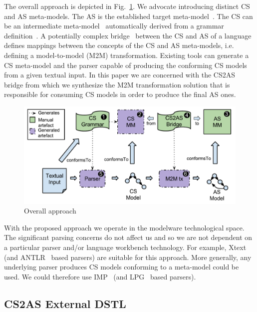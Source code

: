 \documentclass{llncs}
\begin{document}
The overall approach is depicted in Fig.~\ref{fig:OverallApproach}. We advocate introducing distinct CS and AS meta-models. The AS is the established target meta-model~. The CS can be an intermediate meta-model~ automatically derived from a grammar definition~. A potentially complex bridge~ between the CS and AS of a language defines mappings between the concepts of the CS and AS meta-models, i.e. defining a model-to-model (M2M) transformation. Existing tools can generate a CS meta-model and the parser  capable of producing the conforming CS models from a given textual input. In this paper we are concerned with the CS2AS bridge from which we synthesize the M2M transformation solution  that is responsible for consuming CS models in order to produce the final AS ones. 

\begin{figure}[htbp]
	\centering
	\includegraphics[width=\textwidth]{images/OverallApproach.pdf}
	\caption{Overall approach}
	\label{fig:OverallApproach}
\end{figure}
	
With the proposed approach we operate in the modelware technological space. The significant parsing concerns do not affect us and so we are not dependent on a particular parser and/or language workbench technology.  %
For example, Xtext (and ANTLR~\cite{antlrOnline} based parsers) are suitable for this approach. More generally, any underlying parser produces CS models conforming to a meta-model could be used. We could therefore use IMP~\cite{charles2009imp} (and LPG~\cite{lpgOnline} based parsers). %

\subsection{CS2AS External DSTL}
\label{subsec:dstl}
\end{document}
